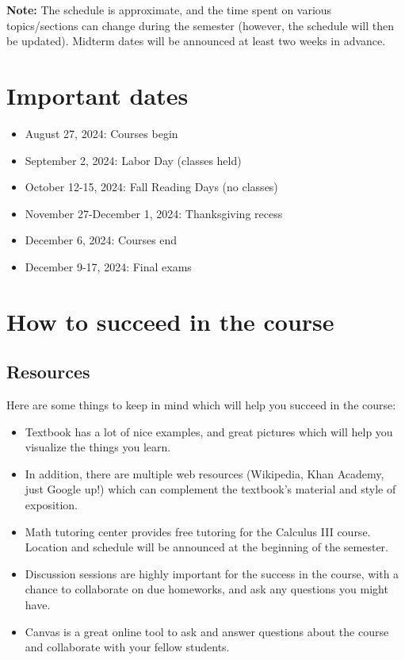 \documentclass[oneside,11pt]{amsart}
\begin{document}
\vspace{5pt}

\textbf{Note:} The schedule is approximate, and the time spent on various topics/sections can change during the semester (however, the schedule will then be updated). Midterm dates will be announced at least two weeks in advance.

\section{Important dates}

\begin{itemize}
	\item August 27, 2024: Courses begin
	\item September 2, 2024: Labor Day (classes held)
	\item October 12-15, 2024: Fall Reading Days (no classes)
	\item November 27-December 1, 2024: Thanksgiving recess
	\item December 6, 2024: Courses end
	\item December 9-17, 2024: Final exams
\end{itemize}

\section{How to succeed in the course}

\subsection{Resources}

Here are some things to keep in mind which will help you succeed in the course:
\begin{itemize}
	\item Textbook has a lot of nice examples, and great pictures which will help you visualize the things you learn.
	\item In addition, there are multiple web resources (Wikipedia, Khan Academy, just Google up!) which can complement the textbook's material and style of exposition.
	\item Math tutoring center provides free tutoring for the Calculus III course. Location and schedule will be announced at the beginning of the semester.
	\item 
	Discussion sessions are highly important for the success in the course, with a chance to collaborate on due homeworks, and ask any questions you might have.
	\item Canvas is a great online tool to ask and answer questions about the course and collaborate with your fellow students.
\end{itemize}
\end{document}
